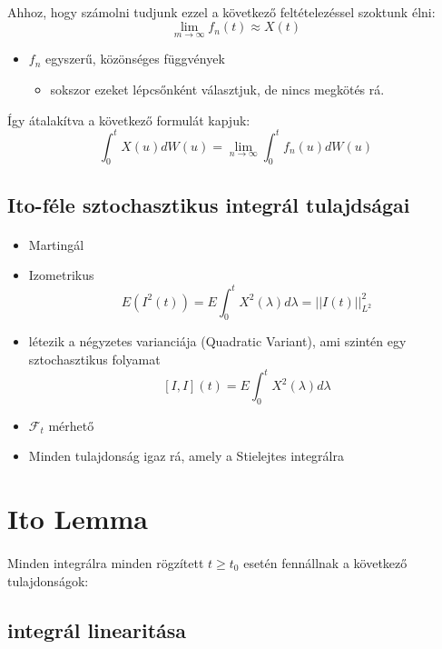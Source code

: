 \documentclass[11pt,a4paper]{article}
\begin{document}
				\paragraph{}
					Ahhoz, hogy számolni tudjunk ezzel a következő feltételezéssel szoktunk élni:
					$$\lim_{m \to \infty} f_n(t) \approx X(t)$$
					\begin{itemize}
						\item $f_n$ egyszerű, közönséges függvények
						\begin{itemize}
							\item sokszor ezeket lépcsőnként választjuk, de nincs megkötés rá.
						\end{itemize}
					\end{itemize}
					Így átalakítva a következő formulát kapjuk:
					$$\int_0^t X(u) dW(u) = \lim_{n \to \infty} \int_0^t f_n(u) dW(u)$$

				\subsection{Ito-féle sztochasztikus integrál tulajdságai}
					\paragraph{}
						\begin{itemize}
							  \item Martingál
							  \item Izometrikus $$E(I^2(t)) = E \int_0^t X^2(\lambda)d\lambda= ||I(t)||^2_{L^2}$$
							  \item létezik a négyzetes varianciája (Quadratic Variant), ami szintén egy sztochasztikus folyamat $$[I,I](t)= E \int_0^t X^2(\lambda)d\lambda$$
							  \item $\mathcal{F}_t$ mérhető
							  \item Minden tulajdonság igaz rá, amely a Stielejtes integrálra
						\end{itemize}
			\section{Ito Lemma}
				\paragraph{}
					Minden integrálra minden rögzített $t \ge t_0$ esetén fennállnak a következő tulajdonságok:
				\subsection{integrál linearitása}
\end{document}
